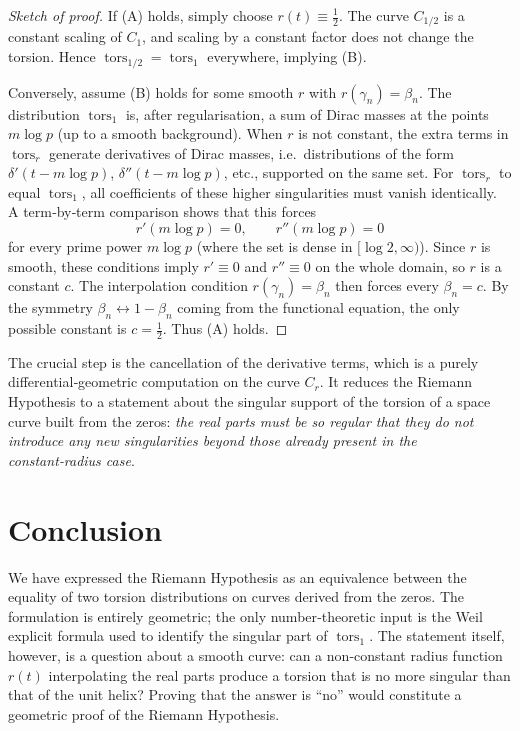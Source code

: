 \documentclass[12pt,a4paper]{article}
\DeclareMathOperator{\tors}{tors}
\begin{document}
\begin{proof}[Sketch of proof]
If (A) holds, simply choose $r(t)\equiv\tfrac12$.  The curve $C_{1/2}$ is a constant scaling of $C_1$, and scaling by a constant factor does not change the torsion.  Hence $\tors_{1/2}= \tors_1$ everywhere, implying (B).

Conversely, assume (B) holds for some smooth $r$ with $r(\gamma_n)=\beta_n$.  
The distribution $\tors_1$ is, after regularisation, a sum of Dirac masses at the points $m\log p$ (up to a smooth background).  When $r$ is not constant, the extra terms in $\tors_r$ generate derivatives of Dirac masses, i.e.\ distributions of the form $\delta'(t-m\log p)$, $\delta''(t-m\log p)$, etc., supported on the same set.  For $\tors_r$ to equal $\tors_1$, all coefficients of these higher singularities must vanish identically.  A term‑by‑term comparison shows that this forces
\[
r'(m\log p)=0,\qquad r''(m\log p)=0
\]
for every prime power $m\log p$ (where the set is dense in $[\log 2,\infty)$).  Since $r$ is smooth, these conditions imply $r'\equiv0$ and $r''\equiv0$ on the whole domain, so $r$ is a constant $c$.  The interpolation condition $r(\gamma_n)=\beta_n$ then forces every $\beta_n=c$.  By the symmetry $\beta_n\leftrightarrow1-\beta_n$ coming from the functional equation, the only possible constant is $c=\tfrac12$.  Thus (A) holds.
\end{proof}

The crucial step is the cancellation of the derivative terms, which is a purely differential‑geometric computation on the curve $C_r$.  It reduces the Riemann Hypothesis to a statement about the singular support of the torsion of a space curve built from the zeros: \emph{the real parts must be so regular that they do not introduce any new singularities beyond those already present in the constant‑radius case}.

\section{Conclusion}

We have expressed the Riemann Hypothesis as an equivalence between the equality of two torsion distributions on curves derived from the zeros.  The formulation is entirely geometric; the only number‑theoretic input is the Weil explicit formula used to identify the singular part of $\tors_1$.  The statement itself, however, is a question about a smooth curve: can a non‑constant radius function $r(t)$ interpolating the real parts produce a torsion that is no more singular than that of the unit helix?  Proving that the answer is “no” would constitute a geometric proof of the Riemann Hypothesis.
\end{document}
